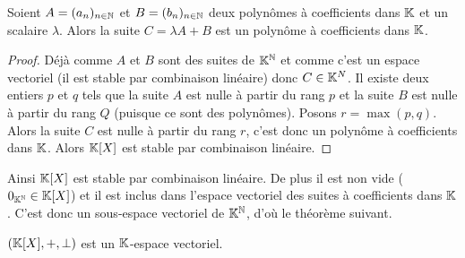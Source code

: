 \begin{lemme}
  Soient \(A = (a_n)_{n \in \mathbb{N}}\) et \(B = (b_n)_{n \in \mathbb{N}}\) deux polynômes à
  coefficients dans \(\mathbb{K}\) et un scalaire \(\lambda\). Alors la suite
  \(C = \lambda A+B\) est un polynôme à coefficients dans \(\mathbb{K}\).
\end{lemme}
\begin{proof}
Déjà comme \(A\) et \(B\) sont des suites de \(\mathbb{K}^{\mathbb{N}}\) et comme c'est un espace
vectoriel (il est stable par combinaison linéaire) donc \(C \in \mathbb{K}^N\). Il
existe deux entiers \(p\) et \(q\) tels que la suite \(A\) est nulle à partir du
rang \(p\) et la suite \(B\) est nulle à partir du rang \(Q\) (puisque ce sont
des polynômes). Posons \(r = \max(p,q)\). Alors la suite \(C\) est nulle à partir
du rang \(r\), c'est donc un polynôme à coefficients dans \(\mathbb{K}\). Alors
\(\mathbb{K}[X]\) est stable par combinaison linéaire. \end{proof}

Ainsi \(\mathbb{K}[X]\) est stable par combinaison linéaire. De plus il est non vide
(\(0_{\mathbb{K}^{\mathbb{N}}} \in \mathbb{K}[X]\)) et il est inclus dans l'espace vectoriel des suites à
coefficients dans \(\mathbb{K}\). C'est donc un sous-espace vectoriel de \(\mathbb{K}^{\mathbb{N}}\), d'où
le théorème suivant.

\begin{theo}
  \((\mathbb{K}[X], +, \perp)\) est un \(\mathbb{K}\)-espace vectoriel.
\end{theo}

